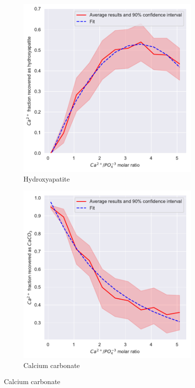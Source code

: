 \begin{refsection}[referencesCh3]
\begin{figure}[h]
\begin{subfigure}[t]{0.32\textheight}
		\includegraphics[width=\textwidth]{gfx/AppendixB/x_plotHAPYield_Ca} 
		\caption{Hydroxyapatite}
		\label{fig:estimation_Ca_HAP}
	\end{subfigure} 
	\begin{subfigure}[t]{0.32\textheight}
		\includegraphics[width=\textwidth]{gfx/AppendixB/x_plotCaCO3Yield_Ca}
		\caption{Calcium carbonate}
		\label{fig:estimation_Ca_CaCO3}
	\end{subfigure}
	

\end{figure}
\end{refsection}
